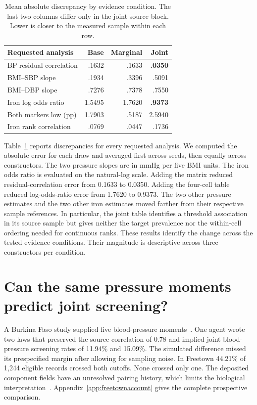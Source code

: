 \documentclass[sigconf,anonymous,review]{acmart}
\begin{document}
\begin{table}[t]
\caption{Mean absolute discrepancy by evidence condition. The last two columns differ only in the joint source block. Lower is closer to the measured sample within each row.}
\label{tab:evidence}
\centering
\begin{tabular}{@{}lrrr@{}}
\toprule
Requested analysis & Base & Marginal & Joint\\
\midrule
BP residual correlation & .1632 & .1633 & \textbf{.0350}\\
BMI--SBP slope & .1934 & .3396 & .5091\\
BMI--DBP slope & .7276 & .7378 & .7550\\
Iron log odds ratio & 1.5495 & 1.7620 & \textbf{.9373}\\
Both markers low (pp) & 1.7903 & .5187 & 2.5940\\
Iron rank correlation & .0769 & .0447 & .1736\\
\bottomrule
\end{tabular}
\end{table}

Table~\ref{tab:evidence} reports discrepancies for every requested analysis. We computed the absolute error for each draw and averaged first across seeds, then equally across constructors. The two pressure slopes are in mmHg per five BMI units. The iron odds ratio is evaluated on the natural-log scale. Adding the matrix reduced residual-correlation error from 0.1633 to 0.0350. Adding the four-cell table reduced log-odds-ratio error from 1.7620 to 0.9373. The two other pressure estimates and the two other iron estimates moved farther from their respective sample references. In particular, the joint table identifies a threshold association in its source sample but gives neither the target prevalence nor the within-cell ordering needed for continuous ranks. These results identify the change across the tested evidence conditions. Their magnitude is descriptive across three constructors per condition.

\section{Can the same pressure moments predict joint screening?}
\label{sec:prospective}
A Burkina Faso study supplied five blood-pressure moments~\cite{jaspert}. One agent wrote two laws that preserved the source correlation of 0.78 and implied joint blood-pressure screening rates of 11.94\% and 15.09\%. The simulated difference missed its prespecified margin after allowing for sampling noise. In Freetown 44.21\% of 1,244 eligible records crossed both cutoffs. None crossed only one. The deposited component fields have an unresolved pairing history, which limits the biological interpretation~\cite{freetown,freetowndata}. Appendix~\ref{app:freetownaccount} gives the complete prospective comparison.
\end{document}

